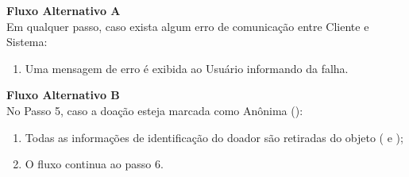 \begin{anexosenv}
\begin{lista}
    \textbf{Fluxo Alternativo A} \\
    Em qualquer passo, caso exista algum erro de comunicação entre Cliente e Sistema:
    \begin{enumerate}
    \item Uma mensagem de erro é exibida ao Usuário informando da falha.
    \end{enumerate}
    
    \textbf{Fluxo Alternativo B} \\
    No Passo 5, caso a doação esteja marcada como Anônima ():
    \begin{enumerate}
    \item Todas as informações de identificação do doador são retiradas do objeto ( e );
    \item O fluxo continua ao passo 6.
    \end{enumerate}
\end{lista}


\end{anexosenv}